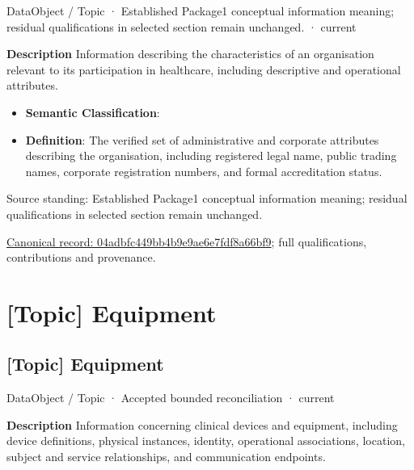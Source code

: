 \label{element:04adbfc449bb4b9e9ae6e7fdf8a66bf9}
{\small DataObject / Topic · Established Package1 conceptual information meaning; residual qualifications in selected section remain unchanged. · current}\par

\textbf{Description}
Information describing the characteristics of an organisation relevant to its participation in healthcare, including descriptive and operational attributes.



\begin{itemize}


\item \textbf{Semantic Classification}: \texttt{}

\item \textbf{Definition}: The verified set of administrative and corporate attributes describing the organisation, including registered legal name, public trading names, corporate registration numbers, and formal accreditation status.

\end{itemize}


Source standing: Established Package1 conceptual information meaning; residual qualifications in selected section remain unchanged.


{\footnotesize \href{../../../../continuum/application/data-object/topic/04adbfc449bb4b9e9ae6e7fdf8a66bf9.md}{Canonical record: 04adbfc449bb4b9e9ae6e7fdf8a66bf9}; full qualifications, contributions and provenance.}\par
\section{[Topic] Equipment}

\subsection{[Topic] Equipment}

\label{element:8e658834311d41e68a8ecf71d8ccd5db}
{\small DataObject / Topic · Accepted bounded reconciliation · current}\par

\textbf{Description}
Information concerning clinical devices and equipment, including device definitions, physical instances, identity, operational associations, location, subject and service relationships, and communication endpoints.


